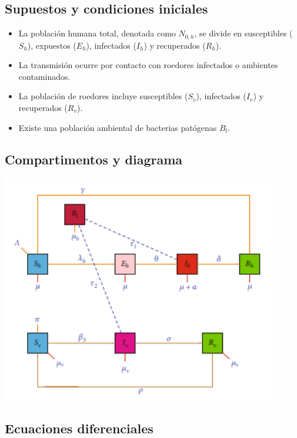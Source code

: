 \documentclass[12pt,a4paper]{article}
\begin{document}
\subsection{Supuestos y condiciones iniciales}
\begin{itemize}
\item La población humana total, denotada como $N_{0,h}$, se divide en susceptibles ($S_h$), expuestos ($E_h$), infectados ($I_h$) y recuperados ($R_h$).
\item La transmisión ocurre por contacto con roedores infectados o ambientes contaminados.
\item La población de roedores incluye susceptibles ($S_v$), infectados ($I_v$) y recuperados ($R_v$).
\item Existe una población ambiental de bacterias patógenas $B_l$.
\end{itemize}

\subsection{Compartimentos y diagrama}
\begin{center}
\includegraphics[width=0.9\textwidth]{Images/modelo_seir.png}
\captionsetup{hypcap=false}
\end{center}

\subsection{Ecuaciones diferenciales}
\end{document}
